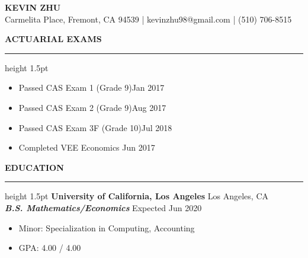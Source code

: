 \documentclass[11pt,letterpaper]{article}
\newcommand{\sectline}{\vspace{4pt}\hrule height 1.5pt\vspace{4pt}}
\newcommand{\sectspace}{\vspace{8pt}}
\begin{document}
\centering
{\fontsize{13pt}{13pt}\selectfont \textbf{KEVIN ZHU}} \vspace{2pt} \\
{\fontsize{12pt}{13pt} Carmelita Place, Fremont, CA 94539 | kevinzhu98@gmail.com | (510) 706-8515}
\sectspace

\fontsize{11pt}{13pt}\selectfont
\raggedright
\textbf{ACTUARIAL EXAMS}\sectline
\begin{itemize}
	\item Passed CAS Exam 1 (Grade 9)\hfill Jan 2017
	\item Passed CAS Exam 2 (Grade 9)\hfill Aug 2017
	\item Passed CAS Exam 3F (Grade 10)\hfill Jul 2018
	\item Completed VEE Economics \hfill Jun 2017
\end{itemize}
\sectspace


\textbf{EDUCATION}\sectline
\textbf{University of California, Los Angeles} \hfill Los Angeles, CA \\
\textbf{\textit{B.S. Mathematics/Economics}} \hfill Expected Jun 2020 
\begin{itemize}
	\item Minor: Specialization in Computing, Accounting
	\item GPA: 4.00 / 4.00
\end{itemize}
\sectspace
\end{document}
